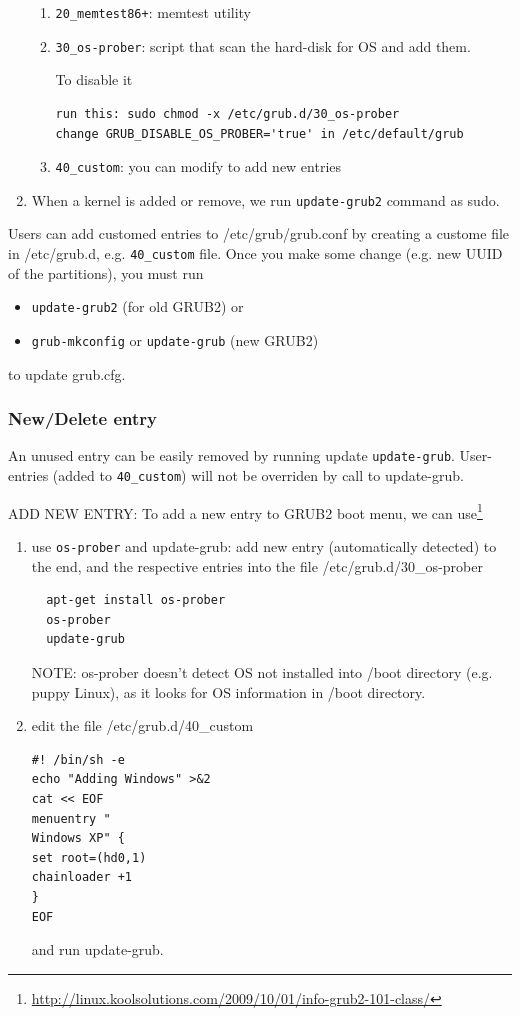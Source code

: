 \begin{enumerate}
\begin{enumerate}
  \item \verb!20_memtest86+!: memtest utility
  \item \verb!30_os-prober!: script that scan the hard-disk for OS and add them.
  
  To disable it
  \begin{verbatim}
run this: sudo chmod -x /etc/grub.d/30_os-prober
change GRUB_DISABLE_OS_PROBER='true' in /etc/default/grub
  \end{verbatim}
  
  \item \verb!40_custom!: you can modify to add new entries
\end{enumerate}

  \item  When a kernel is added or remove, we run \verb!update-grub2! command as
  sudo.
   
\end{enumerate}

Users can add customed entries to /etc/grub/grub.conf by creating a custome
file in /etc/grub.d, e.g. \verb!40_custom! file. Once you make some change
(e.g. new UUID of the partitions), you must run

\begin{itemize}
  \item \verb!update-grub2! (for old GRUB2) or
  \item \verb!grub-mkconfig! or \verb!update-grub! (new GRUB2) 
\end{itemize}
to update grub.cfg.



\subsubsection{New/Delete entry}
\label{sec:GRUB2_newentry}

An unused entry can be easily removed by running update \verb!update-grub!.
User-entries (added to \verb!40_custom!) will not be overriden by call to
update-grub. 

ADD NEW ENTRY: To add a new entry to GRUB2 boot menu, we can
use\footnote{\url{http://linux.koolsolutions.com/2009/10/01/info-grub2-101-class/}}
\begin{enumerate}
  \item use \verb!os-prober! and update-grub: add new entry (automatically
  detected) to the end, and the respective entries into the file
  /etc/grub.d/30\_os-prober
  \begin{verbatim}
  apt-get install os-prober
  os-prober
  update-grub
  \end{verbatim}
NOTE: os-prober doesn't detect OS not installed into /boot directory (e.g. puppy
Linux), as it looks for OS information in /boot directory.  
  
  \item edit the file /etc/grub.d/40\_custom
  \begin{verbatim}
#! /bin/sh -e
echo "Adding Windows" >&2
cat << EOF
menuentry "
Windows XP" {
set root=(hd0,1)
chainloader +1
}
EOF
  \end{verbatim}
  and run update-grub.
\end{enumerate}



